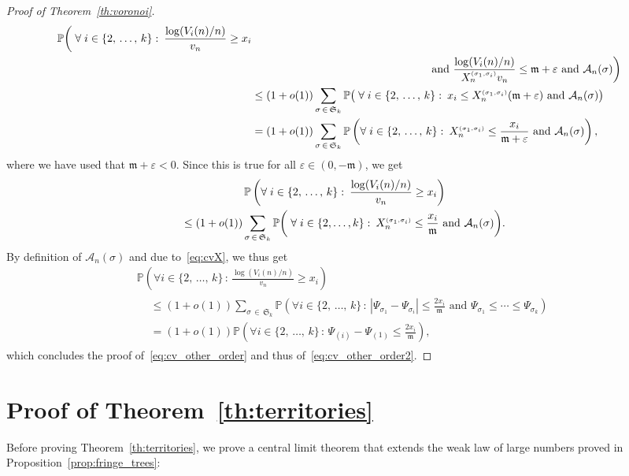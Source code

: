 \documentclass[AHL,Unicode,longabstracts,published]{cedram}
\newcommand{\sss}{\ensuremath{\scriptscriptstyle}}
\newcommand{\bbP}{\mathbb{P}}
\newcommand{\clA}{\mathcal{A}}
\newcommand{\frkm}{\mathfrak{m}}
\newcommand{\frkS}{\mathfrak{S}}
\let\oldforall\forall
\renewcommand*{\forall}{\mathrel{\oldforall}}
\begin{document}
\begin{proof}[Proof of Theorem~\ref{th:voronoi}]
\begin{multline*}
\begin{aligned}
\bbP\bigg(\forall i \in \{2,\,\ldots,\,k\} \, \colon\,
\frac{\log (V_i(n)/n)}{v_n}\geq x_i \\
&\hskip16em\text{ and }
\frac{\log (V_i(n)/n)}{X_n^{\sss (\sigma_1,\sigma_i)}v_n}\leq \frkm+\varepsilon\text{ and }\clA_n(\sigma)\bigg)\\
&\leq (1+o(1))\sum_{\sigma\,\in\,\frkS_k}
\bbP\big(\forall i \in \{2,\,\ldots,\,k\} \, \colon\, x_i\leq X_n^{\sss (\sigma_1,\sigma_i)}(\frkm+\varepsilon)
\text{ and }\clA_n(\sigma)\big)\\
& = (1+o(1))\sum_{\sigma\,\in\,\frkS_k}
\bbP\left(\forall i \in \{2,\,\ldots,\,k\} \, \colon\, X_n^{\sss (\sigma_1,\sigma_i)}\leq \frac{x_i}{\frkm+\varepsilon}
\text{ and }\clA_n(\sigma)\right),
\end{aligned}
\end{multline*}
where we have used that $\frkm+\varepsilon<0$. Since this is true for all $\varepsilon\in(0,-\frkm)$, we get
\begin{multline*}
\bbP\left(\forall i \in \{2, \,\ldots,\, k\} \, \colon\, \frac{\log (V_i(n)/n)}{v_n}\geq x_i\right)
\\
\leq (1+o(1))\sum_{\sigma\,\in\,\frkS_k} \bbP\bigg(\forall i \in \{2, \ldots, k\} \, \colon\, X_n^{\sss (\sigma_1,\sigma_i)}\leq \frac{x_i}{\frkm}
\text{ and }\clA_n(\sigma)\bigg).
\end{multline*}
By definition of $\clA_n(\sigma)$ and due to~\eqref{eq:cvX}, we thus get
\begin{multline*}
\bbP\left(\forall i \in \{2, \,\ldots,\, k\} \, \colon\, \frac{\log (V_i(n)/n)}{v_n}\geq x_i\right)\\
\begin{aligned}
&\leq (1+o(1))\sum_{\sigma\,\in\,\frkS_k}
\bbP\left(\forall i \in \{2, \,\ldots,\, k\} \, \colon\, |\Psi_{\sigma_1}-\Psi_{\sigma_i}|\leq \frac{2x_i}{\frkm}
\text{ and }\Psi_{\sigma_1}\leq \cdots \leq \Psi_{\sigma_k}\right)\\
&= (1+o(1))\bbP\left(\forall i \in \{2,\,\ldots,\,k\} \, \colon\,
\Psi_{(i)}-\Psi_{(1)}\leq \frac{2x_i}{\frkm}\right),
\end{aligned}
\end{multline*}
which concludes the proof of~\eqref{eq:cv_other_order} and thus of~\eqref{eq:cv_other_order2}.
\end{proof}


\section{Proof of Theorem~\ref{th:territories}}\label{sec:territories}
Before proving Theorem~\ref{th:territories}, we prove a central limit theorem that extends the weak law of large numbers proved in Proposition~\ref{prop:fringe_trees}:
\end{document}
